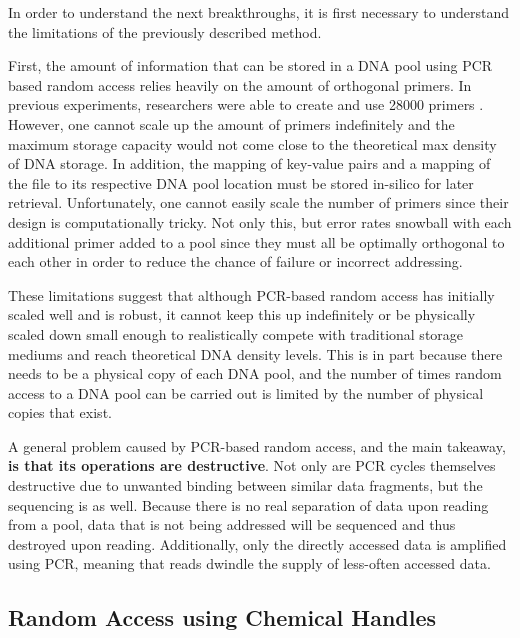 \documentclass[a4paper,conference]{IEEEtran}
\begin{document}

In order to understand the next breakthroughs, it is first necessary to understand the limitations of the previously described method.

First, the amount of information that can be stored in a DNA pool using PCR based random access relies heavily on the amount of orthogonal primers. In previous experiments, researchers were able to create and use 28000 primers \cite{organick_random_2018}. However, one cannot scale up the amount of primers indefinitely and the maximum storage capacity would not come close to the theoretical max density of DNA storage. In addition, the mapping of key-value pairs and a mapping of the file to its respective DNA pool location must be stored in-silico for later retrieval. Unfortunately, one cannot easily scale the number of primers since their design is computationally tricky. Not only this, but error rates snowball with each additional primer added to a pool since they must all be optimally orthogonal to each other in order to reduce the chance of failure or incorrect addressing.

These limitations suggest that although PCR-based random access has initially scaled well and is robust, it cannot keep this up indefinitely or be physically scaled down small enough to realistically compete with traditional storage mediums and reach theoretical DNA density levels. This is in part because there needs to be a physical copy of each DNA pool, and the number of times random access to a DNA pool can be carried out is limited by the number of physical copies that exist.

A general problem caused by PCR-based random access, and the main takeaway, \textbf{is that its operations are destructive}. Not only are PCR cycles themselves destructive due to unwanted binding between similar data fragments, but the sequencing is as well. Because there is no real separation of data upon reading from a pool, data that is not being addressed will be sequenced and thus destroyed upon reading. Additionally, only the directly accessed data is amplified using PCR, meaning that reads dwindle the supply of less-often accessed data.

\subsection{Random Access using Chemical Handles}
\end{document}
